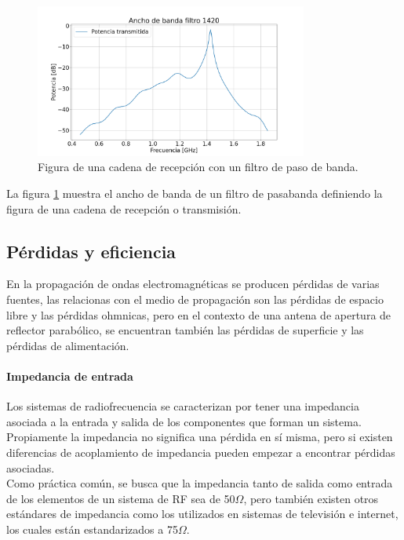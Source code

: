 \begin{figure}
    \centering
    \includegraphics[width = 0.8\textwidth]{img/s21Fh1}
    \caption{Figura de una cadena de recepción con un filtro de paso de banda.}
    \label{fig:bandwidth2}
\end{figure}

La figura \ref{fig:bandwidth2} muestra el ancho de banda de un filtro de pasabanda definiendo la figura de una cadena de recepción o transmisión.\\


\subsection{Pérdidas y eficiencia}

En la propagación de ondas electromagnéticas se producen pérdidas de varias fuentes, las relacionas con el medio de propagación son las pérdidas de espacio libre y las pérdidas ohmnicas, pero en el contexto de una antena de apertura de reflector parabólico, se encuentran también las pérdidas de superficie y las pérdidas de alimentación.\\

\paragraph{Impedancia de entrada}

Los sistemas de radiofrecuencia se caracterizan por tener una impedancia asociada a la entrada y salida de los componentes que forman un sistema. Propiamente la impedancia no significa una pérdida en sí misma, pero si existen diferencias de acoplamiento de impedancia pueden empezar a encontrar pérdidas asociadas.\\

Como práctica común, se busca que la impedancia tanto de salida como entrada de los elementos de un sistema de RF sea de 50$\Omega$, pero también existen otros estándares de impedancia como los utilizados en sistemas de televisión e internet, los cuales están estandarizados a 75$\Omega$.\\

